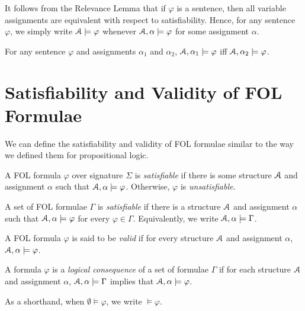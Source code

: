 \documentclass[11pt,usenames, dvipsnames]{article}
\begin{document}
It follows from the Relevance Lemma that if $\varphi$ is a sentence, then all variable assignments are equivalent with respect to satisfiability. Hence, for any sentence $\varphi$, we simply write $\struct \models \varphi$ whenever $\struct, \alpha \models \varphi$ for some assignment $\alpha$.

\begin{corollary}
  For any sentence $\varphi$ and assignments $\alpha_1$ and $\alpha_2$, $\struct, \alpha_1 \models \varphi$ iff $\struct, \alpha_2 \models \varphi$.
\end{corollary}

\section*{\large \centering Satisfiability and Validity of FOL Formulae}
\noindent

We can define the satisfiability and validity of FOL formulae similar to the way we defined them for propositional logic.

\begin{definition}[Satisfiability]
  A FOL formula $\varphi$ over signature $\Sigma$ is \emph{satisfiable} if there is some structure $\struct$ and assignment $\alpha$ such that $\struct, \alpha \models \varphi$. Otherwise, $\varphi$ is \emph{unsatisfiable}.
\end{definition}

\begin{definition}
  A set of FOL formulae $\Gamma$ is \emph{satisfiable} if there is a structure $\struct$ and assignment $\alpha$ such that $\struct, \alpha \models \varphi$ for every $\varphi \in \Gamma$. Equivalently, we write $\struct, \alpha \models \Gamma$.
\end{definition}

\begin{definition}[Validity]
  A FOL formula $\varphi$ is said to be \emph{valid} if for every structure $\struct$ and assignment $\alpha$, $\struct, \alpha \models \varphi$.
\end{definition}

\begin{definition}
  A formula $\varphi$ is a \emph{logical consequence} of a set of formulae $\Gamma$ if for each structure $\struct$ and assignment $\alpha$, $\struct, \alpha \models \Gamma$ implies that $\struct, \alpha \models \varphi$.

  As a shorthand, when $\emptyset \models \varphi$, we write $\models \varphi$.
\end{definition}
\end{document}
